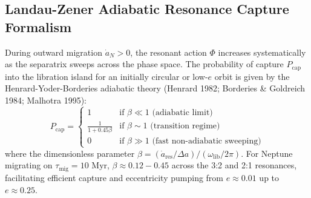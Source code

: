 \documentclass[11pt,a4paper]{article}
\begin{document}
\subsection{Landau-Zener Adiabatic Resonance Capture Formalism}
During outward migration $\dot{a}_N > 0$, the resonant action $\Phi$ increases systematically as the separatrix sweeps across the phase space. The probability of capture $P_{\text{cap}}$ into the libration island for an initially circular or low-$e$ orbit is given by the Henrard-Yoder-Borderies adiabatic theory (Henrard 1982; Borderies \& Goldreich 1984; Malhotra 1995):
\begin{equation}
P_{\text{cap}} = \begin{cases}
1 & \text{if } \beta \ll 1 \text{ (adiabatic limit)} \\
\frac{1}{1 + 0.45\beta} & \text{if } \beta \sim 1 \text{ (transition regime)} \\
0 & \text{if } \beta \gg 1 \text{ (fast non-adiabatic sweeping)}
\end{cases}
\end{equation}
where the dimensionless parameter $\beta = (\dot{a}_{\text{res}}/\Delta a) / (\omega_{\text{lib}}/2\pi)$. For Neptune migrating on $\tau_{\text{mig}} = 10\text{ Myr}$, $\beta \approx 0.12 - 0.45$ across the 3:2 and 2:1 resonances, facilitating efficient capture and eccentricity pumping from $e \approx 0.01$ up to $e \approx 0.25$.
\end{document}
